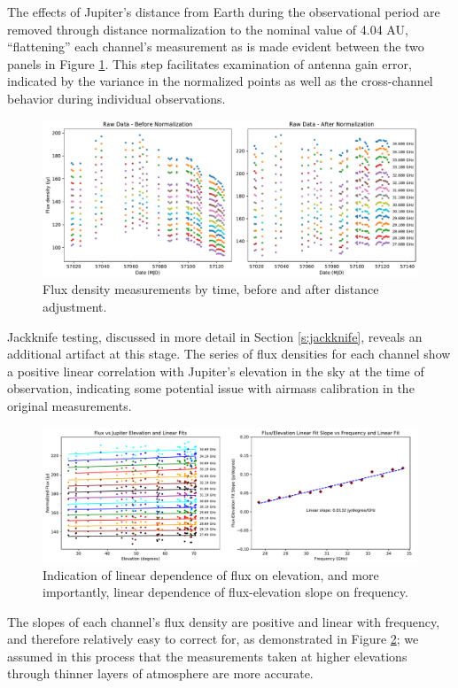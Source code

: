 \documentclass{article}
\begin{document}
	The effects of Jupiter's distance from Earth during the observational period are removed through distance normalization to the nominal value of 4.04 AU, ``flattening'' each channel's measurement as is made evident between the two panels in Figure \ref{fig:raw}.
	This step facilitates examination of antenna gain error, indicated by the variance in the normalized points as well as the cross-channel behavior during individual observations.
	\begin{figure}
		\centering
		\includegraphics[width=\textwidth]{final_raw.pdf}
		\caption{\label{fig:raw}Flux density measurements by time, before and after distance adjustment.}
	\end{figure}
	Jackknife testing, discussed in more detail in Section \ref{s:jackknife}, reveals an additional artifact at this stage.
	The series of flux densities for each channel show a positive linear correlation with Jupiter's elevation in the sky at the time of observation, indicating some potential issue with airmass calibration in the original measurements.
	\begin{figure}
		\centering
		\includegraphics[width=\textwidth]{final_airmass.pdf}
		\caption{\label{fig:air}Indication of linear dependence of flux on elevation, and more importantly, linear dependence of flux-elevation slope on frequency.}
	\end{figure}
	The slopes of each channel's flux density are positive and linear with frequency, and therefore relatively easy to correct for, as demonstrated in Figure \ref{fig:air}; we assumed in this process that the measurements taken at higher elevations through thinner layers of atmosphere are more accurate.
\end{document}
